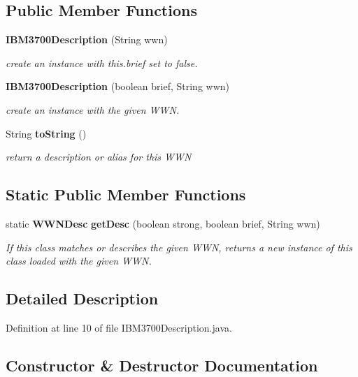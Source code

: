 \subsection*{Public Member Functions}
\begin{DoxyCompactItemize}
\item 
{\bf I\-B\-M3700\-Description} (String wwn)
\begin{DoxyCompactList}\small\item\em create an instance with this.\-brief set to false. \end{DoxyCompactList}\item 
{\bf I\-B\-M3700\-Description} (boolean brief, String wwn)
\begin{DoxyCompactList}\small\item\em create an instance with the given W\-W\-N. \end{DoxyCompactList}\item 
String {\bf to\-String} ()
\begin{DoxyCompactList}\small\item\em return a description or alias for this W\-W\-N \end{DoxyCompactList}\end{DoxyCompactItemize}
\subsection*{Static Public Member Functions}
\begin{DoxyCompactItemize}
\item 
static {\bf W\-W\-N\-Desc} {\bf get\-Desc} (boolean strong, boolean brief, String wwn)
\begin{DoxyCompactList}\small\item\em If this class matches or describes the given W\-W\-N, returns a new instance of this class loaded with the given W\-W\-N. \end{DoxyCompactList}\end{DoxyCompactItemize}


\subsection{Detailed Description}


Definition at line 10 of file I\-B\-M3700\-Description.\-java.



\subsection{Constructor \& Destructor Documentation}
